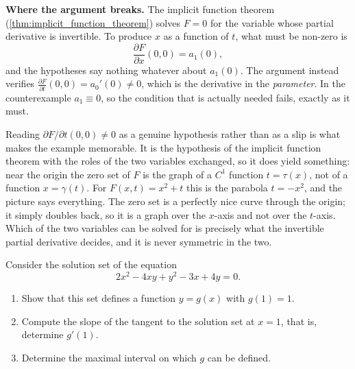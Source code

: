 \begin{example}
\textbf{Where the argument breaks.} The implicit function theorem
(\cref{thm:implicit_function_theorem}) solves $F = 0$ for the variable whose partial derivative is
invertible. To produce $x$ as a function of $t$, what must be non-zero is
\[\frac{\partial F}{\partial x}(0,0) = a_1(0),\]
and the hypotheses say nothing whatever about $a_1(0)$. The argument instead verifies
$\frac{\partial F}{\partial t}(0,0) = a_0'(0) \neq 0$, which is the derivative in the
\emph{parameter}. In the counterexample $a_1 \equiv 0$, so the condition that is actually needed
fails, exactly as it must.

\begin{remark}
Reading $\partial F/\partial t(0,0) \neq 0$ as a genuine hypothesis rather than as a slip is what
makes the example memorable. It is the hypothesis of the implicit function theorem with the roles
of the two variables exchanged, so it does yield something: near the origin the zero set of $F$ is
the graph of a $C^1$ function $t = \tau(x)$, not of a function $x = \gamma(t)$. For $F(x,t) = x^2+t$
this is the parabola $t = -x^2$, and the picture says everything. The zero set is a perfectly nice
curve through the origin; it simply doubles back, so it is a graph over the $x$-axis and not over
the $t$-axis. Which of the two variables can be solved for is precisely what the invertible
partial derivative decides, and it is never symmetric in the two.
\end{remark}
\end{example}

\begin{exercise}
\label{ex:kobel_conic_implicit_maximal_interval}
Consider the solution set of the equation
\[2x^2 - 4xy + y^2 - 3x + 4y = 0.\]
\begin{enumerate}[label=\textbf{(\alph*)}]
  \item Show that this set defines a function $y = g(x)$ with $g(1) = 1$.
  \item Compute the slope of the tangent to the solution set at $x = 1$, that is, determine
    $g'(1)$.
  \item Determine the maximal interval on which $g$ can be defined.
\end{enumerate}
\end{exercise}

